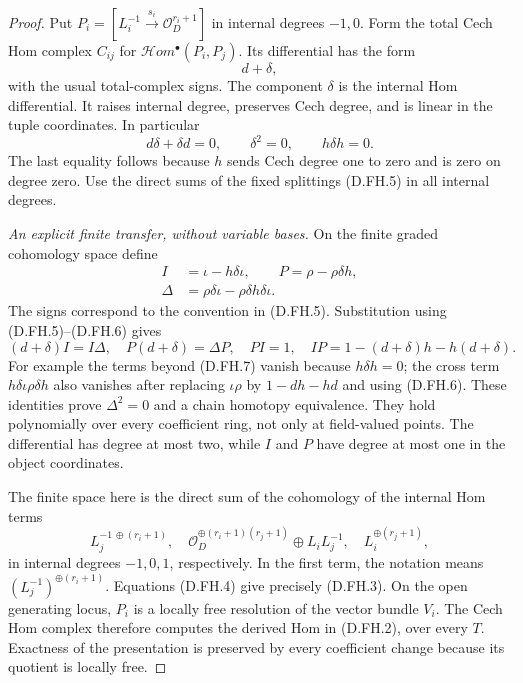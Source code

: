 \begin{proof}
Put $P_i=[L_i^{-1}\xrightarrow{s_i}\mathcal O_D^{r_i+1}]$
in internal degrees $-1,0$. Form the total Cech Hom complex
$C_{ij}$ for $\mathcal Hom^\bullet(P_i,P_j)$. Its differential
has the form
\[
                         d+\delta,
\]
with the usual total-complex signs. The component $\delta$
is the internal Hom differential. It raises internal degree,
preserves Cech degree, and is linear in the tuple coordinates.
In particular
\[
 d\delta+\delta d=0,\qquad \delta^2=0,\qquad
                         h\delta h=0.                  \tag{D.FH.6}
\]
The last equality follows because $h$ sends Cech degree one
to zero and is zero on degree zero. Use the direct sums of
the fixed splittings (D.FH.5) in all internal degrees.

\emph{An explicit finite transfer, without variable bases.}
On the finite graded cohomology space define
\[
 \begin{split}
 I&=\iota-h\delta\iota,\qquad
 P=\rho-\rho\delta h,\\
 \Delta&=\rho\delta\iota-\rho\delta h\delta\iota.
 \end{split}                                           \tag{D.FH.7}
\]
The signs correspond to the convention in (D.FH.5).
Substitution using (D.FH.5)--(D.FH.6) gives
\[
 (d+\delta)I=I\Delta,\quad
 P(d+\delta)=\Delta P,\quad PI=1,\quad
 IP=1-(d+\delta)h-h(d+\delta).                          \tag{D.FH.8}
\]
For example the terms beyond (D.FH.7) vanish because
$h\delta h=0$; the cross term
$h\delta\iota\rho\delta h$ also vanishes after replacing
$\iota\rho$ by $1-dh-hd$ and using (D.FH.6).
These identities prove $\Delta^2=0$ and a chain homotopy
equivalence. They hold polynomially over every coefficient
ring, not only at field-valued points. The differential
has degree at most two, while $I$ and $P$ have degree at most
one in the object coordinates.

The finite space here is the direct sum of the cohomology
of the internal Hom terms
\[
 L_j^{-1\,\oplus(r_i+1)},\quad
 \mathcal O_D^{\oplus(r_i+1)(r_j+1)}\oplus L_iL_j^{-1},
 \quad L_i^{\oplus(r_j+1)},                             \tag{D.FH.9}
\]
in internal degrees $-1,0,1$, respectively. In the first
term, the notation means $(L_j^{-1})^{\oplus(r_i+1)}$.
Equations (D.FH.4) give precisely (D.FH.3).
On the open generating locus, $P_i$ is a locally free
resolution of the vector bundle $V_i$. The Cech Hom complex
therefore computes the derived Hom in (D.FH.2), over every
$T$. Exactness of the presentation is preserved by every
coefficient change because its quotient is locally free.


\end{proof}
